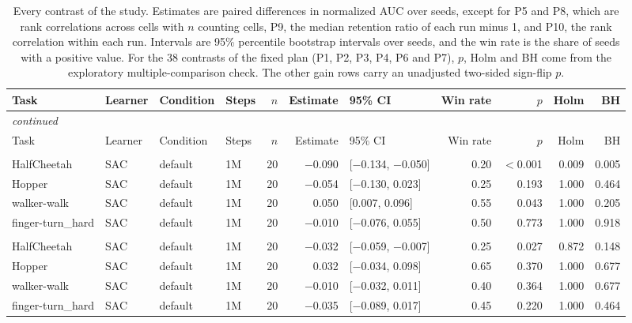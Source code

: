 \begingroup\small
\setlength{\tabcolsep}{2.5pt}
\begin{longtable}{llllrrlrrrr}
\caption{Every contrast of the study. Estimates are paired differences in normalized AUC over seeds, except for P5 and P8, which are rank correlations across cells with $n$ counting cells, P9, the median retention ratio of each run minus 1, and P10, the rank correlation within each run. Intervals are 95\% percentile bootstrap intervals over seeds, and the win rate is the share of seeds with a positive value. For the 38 contrasts of the fixed plan (P1, P2, P3, P4, P6 and P7), $p$, Holm and BH come from the exploratory multiple-comparison check. The other gain rows carry an unadjusted two-sided sign-flip $p$.}\label{tab:allcontrasts} \\
\toprule
Task & Learner & Condition & Steps & $n$ & Estimate & 95\% CI & Win rate & $p$ & Holm & BH \\
\midrule
\endfirsthead
\multicolumn{11}{l}{\footnotesize\textit{continued}} \\
\toprule
Task & Learner & Condition & Steps & $n$ & Estimate & 95\% CI & Win rate & $p$ & Holm & BH \\
\midrule
\endhead
\bottomrule
\endfoot
\multicolumn{11}{l}{\textit{P1 (Q1): IER $-$ BASE}} \\*
HalfCheetah & SAC & default & 1M & 20 & $-$0.090 & [$-$0.134, $-$0.050] & 0.20 & $<$0.001 & 0.009 & 0.005 \\
Hopper & SAC & default & 1M & 20 & $-$0.054 & [$-$0.130, 0.023] & 0.25 & 0.193 & 1.000 & 0.464 \\
walker-walk & SAC & default & 1M & 20 & 0.050 & [0.007, 0.096] & 0.55 & 0.043 & 1.000 & 0.205 \\
finger-turn\_hard & SAC & default & 1M & 20 & $-$0.010 & [$-$0.076, 0.055] & 0.50 & 0.773 & 1.000 & 0.918 \\
\addlinespace
\multicolumn{11}{l}{\textit{P2 (Q1): IER $-$ IER-REL}} \\*
HalfCheetah & SAC & default & 1M & 20 & $-$0.032 & [$-$0.059, $-$0.007] & 0.25 & 0.027 & 0.872 & 0.148 \\
Hopper & SAC & default & 1M & 20 & 0.032 & [$-$0.034, 0.098] & 0.65 & 0.370 & 1.000 & 0.677 \\
walker-walk & SAC & default & 1M & 20 & $-$0.010 & [$-$0.032, 0.011] & 0.40 & 0.364 & 1.000 & 0.677 \\
finger-turn\_hard & SAC & default & 1M & 20 & $-$0.035 & [$-$0.089, 0.017] & 0.45 & 0.220 & 1.000 & 0.464 \\

\end{longtable}
